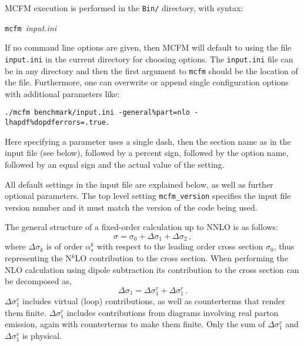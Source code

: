 
MCFM execution is performed in the {\tt Bin/} directory,
with syntax:
\begin{center}
	{\tt mcfm }{\it input.ini}
\end{center}
If no command line options are given, then MCFM will default
to using the file {\tt input.ini} in the current directory for
choosing options. The \texttt{input.ini} file can be in any directory and
then the first argument to \texttt{mcfm} should be the location
of the file. Furthermore, one can overwrite or append single
configuration options with additional parameters like:
\begin{center} 
\texttt{./mcfm benchmark/input.ini -general\%part=nlo -lhapdf\%dopdferrors=.true.}
\end{center}
Here specifying a parameter uses a single dash, then the section name as in the input file (see below), followed
by a percent sign, followed by the option name, followed by an equal sign and the actual value of the setting.

All default settings in the input file are explained below, as well as further optional parameters.
The top level setting \texttt{mcfm\_version} specifies the input file version number and it must  match the version of 
the code being used.

The general structure of a fixed-order calculation up to NNLO is as follows:
\begin{equation}
\sigma = \sigma_0 + \Delta\sigma_1 + \Delta\sigma_2 \,,
\end{equation}
where $\Delta\sigma_k$ is of order $\alpha_s^k$ with respect to the leading
order cross section $\sigma_0$, thus representing the
N$^k$LO contribution to the cross section.
When performing the NLO calculation using dipole subtraction
its contribution to the cross section can be decomposed as,
\begin{equation}
\Delta\sigma_1 = \Delta\sigma_1^v + \Delta\sigma_1^r \,.
\end{equation}
$\Delta\sigma_1^v$ includes virtual (loop) contributions, as well
as counterterms that render them finite.
$\Delta\sigma_1^r$ includes contributions from diagrams
involving real parton emission, again with counterterms to make them finite.
Only the sum of $\Delta\sigma_1^v$ and $\Delta\sigma_1^v$ is physical.

